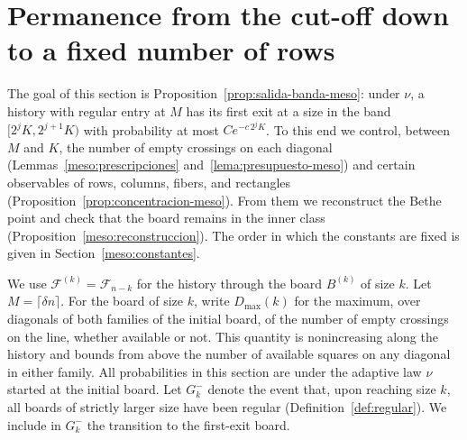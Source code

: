 \section{Permanence from the cut-off down to a fixed number of rows}\label{meso}
The goal of this section is Proposition~\ref{prop:salida-banda-meso}: under $\nu$, a history with
regular entry at $M$ has its first exit at a size in the band $[2^jK,2^{j+1}K)$ with probability at
most $Ce^{-c\,2^jK}$. To this end we control, between $M$ and $K$, the number of empty crossings on
each diagonal (Lemmas~\ref{meso:prescripciones} and~\ref{lema:presupuesto-meso}) and certain
observables of rows, columns, fibers, and rectangles (Proposition~\ref{prop:concentracion-meso}).
From them we reconstruct the Bethe point and check that the board remains in the inner class
(Proposition~\ref{meso:reconstruccion}). The order in which the constants are fixed is given in
Section~\ref{meso:constantes}.

We use $\mathcal F^{(k)}=\mathcal F_{n-k}$ for the history through the board $B^{(k)}$ of size $k$.
Let $M=\lceil\delta n\rceil$. For
the board of size $k$, write $D_{\max}(k)$ for the maximum, over diagonals of both families of the initial
board, of the number of empty crossings on the line, whether available or not. This quantity is
nonincreasing along the history and bounds from above the number of available squares on any diagonal in
either family. All probabilities in this section are under the adaptive law $\nu$ started at the initial
board. Let $G_k^-$ denote the event that, upon reaching size $k$, all boards of strictly larger size have
been regular (Definition~\ref{def:regular}). We include in $G_k^-$ the transition to the first-exit board.

